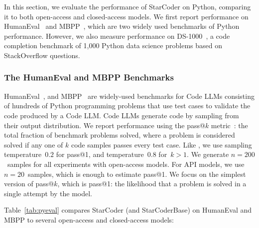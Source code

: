 \documentclass[10pt]{article} %
\begin{document}
In this section, we evaluate the performance of StarCoder on Python, comparing it to both open-access and closed-access models. We first report performance on HumanEval~\citep{chen2021codex} and MBPP~\citep{austin2021program}, which are two widely used benchmarks of Python performance. However, we also measure performance on DS-1000~\citep{Lai2022DS1000}, a code completion benchmark of 1,000 Python data science problems based on StackOverflow questions.


\begin{table}[t]
\centering

\caption{Comparing StarCoder's performance (pass@1) on the HumanEval and MBPP Python with several other models. StarCoder and StarCoder base obtain the highest performance of open-access models, and comparable performance to the code-cushman-001 closed access model. %
} %

\label{tab:pyeval}
\end{table}

\subsubsection{The HumanEval and MBPP Benchmarks}

HumanEval~\citep{chen2021codex}, and MBPP~\citep{austin2021program} are widely-used benchmarks for Code LLMs consisting of hundreds of Python programming problems that use test cases to validate the code produced by a Code LLM.
Code LLMs generate code by sampling from their output distribution. We report performance using the pass@$k$ metric~\citep{chen2021codex}: the total fraction of benchmark problems solved, where a problem is considered solved if any one of $k$ code samples passes every test case. Like \citet{chen2021codex}, we use sampling temperature~$0.2$ for pass@1, and temperature~$0.8$ for~$k > 1$. We generate $n=200$~samples for all experiments with open-access models. For API models, we use $n=20$~samples, which is enough to estimate pass@1. We focus on the simplest version of pass@$k$, which is pass@1: the likelihood that a problem is solved in a single attempt by the model.

Table~\ref{tab:pyeval} compares StarCoder (and StarCoderBase) on HumanEval and MBPP to several open-access and closed-access models:
\end{document}
